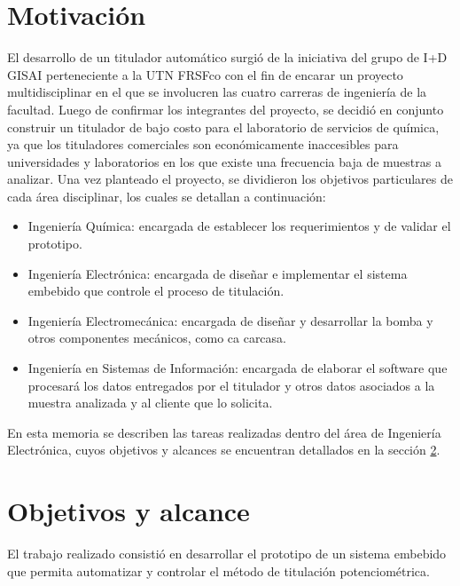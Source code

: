 \section{Motivación}
El desarrollo de un titulador automático surgió de la iniciativa del grupo de I+D GISAI perteneciente a la UTN FRSFco con el fin de encarar un proyecto multidisciplinar en el que se involucren las cuatro carreras de ingeniería de la facultad. Luego de confirmar los integrantes del proyecto, se decidió en conjunto construir un titulador de bajo costo para el laboratorio de servicios de química, ya que los tituladores comerciales son económicamente inaccesibles para universidades y laboratorios en los que existe una frecuencia baja de muestras a analizar.
Una vez planteado el proyecto, se dividieron los objetivos particulares de cada área disciplinar, los cuales se detallan a continuación:
\begin{itemize}
\item Ingeniería Química: encargada de establecer los requerimientos y de validar el prototipo.
\item Ingeniería Electrónica: encargada de diseñar e implementar el sistema embebido que controle el proceso de titulación.
\item Ingeniería Electromecánica: encargada de diseñar y desarrollar la bomba y otros componentes mecánicos, como ca carcasa.
\item Ingeniería en Sistemas de Información: encargada de elaborar el software que procesará los datos entregados por el titulador y otros datos asociados a la muestra analizada y al cliente que lo solicita.
\end{itemize}
En esta memoria se describen las tareas realizadas dentro del área de Ingeniería Electrónica, cuyos objetivos y alcances se encuentran detallados en la sección \ref{objYalc}.

\section{Objetivos y alcance}
\label{objYalc}

El trabajo realizado consistió en desarrollar el prototipo de un sistema embebido que permita automatizar y controlar el método de titulación potenciométrica.

